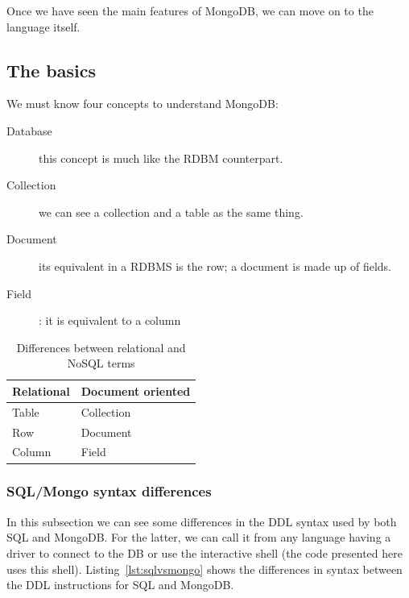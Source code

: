 Once we have seen the main features of MongoDB, we can move on to the language itself.

\subsection{The basics}

We must know four concepts to understand MongoDB:

\begin{description} %
\item[Database] this concept is much like the RDBM counterpart.
\item[Collection] we can see a collection and a table as the same thing.
\item[Document] its equivalent in
a RDBMS %
is the 
row; %
a document is made up of fields.
\item[Field]: it is equivalent to a column %
\end{description} %


\begin{table}
\begin{center}
\begin{tabular}{|l|l|}
\hline
\textbf{Relational} & \textbf{Document oriented} \\ 
\hline
Table & Collection\\
\hline
Row & Document\\
\hline
Column & Field \\
\hline
\end{tabular}
\end{center}
\caption{Differences between relational and NoSQL terms}
\end{table}





\subsubsection{SQL/Mongo syntax differences}

In this subsection we can see some differences in the DDL syntax used by both SQL and MongoDB. For the latter, we can call it from any language having a driver to connect to the DB or use the interactive shell (the code presented here uses this shell). Listing~\ref{lst:sqlvsmongo} shows the differences in syntax between the DDL instructions for SQL and MongoDB.

